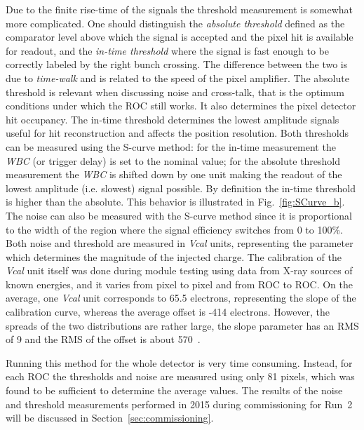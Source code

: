Due to the finite rise-time of the signals the threshold measurement is somewhat more complicated. 
One should distinguish the \textit{absolute threshold} defined as the comparator level above which the signal is accepted and the pixel hit is available for readout, and the \textit{in-time threshold} where the signal is fast enough to be correctly labeled by the right bunch crossing.
The difference between the two is due to \textit{time-walk} and is related to the speed of the pixel amplifier.
The absolute threshold is relevant when discussing noise and cross-talk, that is the optimum conditions under which the ROC still works. It also determines the pixel detector hit occupancy.
The in-time threshold determines the lowest amplitude signals useful for hit reconstruction and affects the position resolution.
Both thresholds can be measured using the S-curve method: for the in-time measurement the \textit{WBC} (or trigger delay) is set to the nominal value; for the absolute threshold measurement the \textit{WBC} is shifted down by one unit making the readout of the lowest amplitude (i.e. slowest) signal possible. By definition the in-time threshold is higher than the absolute. This behavior is illustrated in Fig.~\ref{fig:SCurve_b}.\\

The noise can also be measured with the S-curve method since it is proportional to the width of the region where the signal efficiency switches from 0 to 100\%.
Both noise and threshold are measured in \textit{Vcal} units, representing the parameter which determines the magnitude of the injected charge.
The calibration of the \textit{Vcal} unit itself was done during module testing using data from X-ray sources of known energies, and it varies from pixel to pixel and from ROC to ROC.
On the average, one \textit{Vcal} unit corresponds to 65.5 electrons, representing the slope of the calibration curve, whereas the average offset is -414 electrons.
However, the spreads of the two distributions are rather large, the slope parameter has an RMS of 9 and the RMS of the offset is about 570~\cite{1748-0221-4-03-P03019}.

Running this method for the whole detector is very time consuming. Instead, for each ROC the thresholds and noise are measured using only 81 pixels, which was found to be sufficient to determine the average values.
The results of the noise and threshold measurements performed in 2015 during commissioning for Run~2 will be discussed in Section~\ref{sec:commissioning}.

